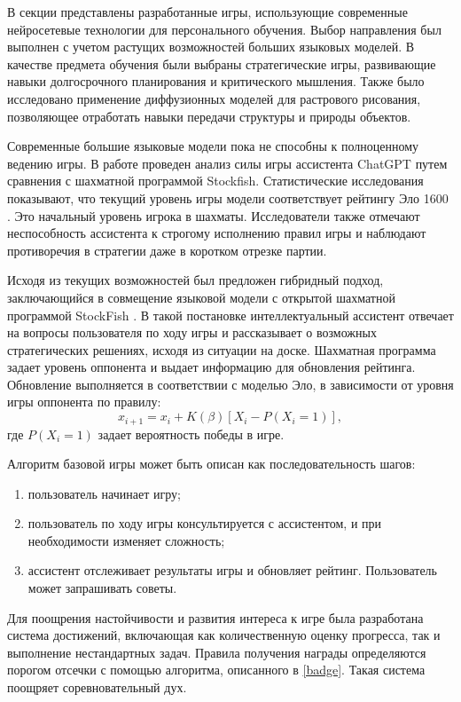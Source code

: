 В секции представлены разработанные игры, использующие современные нейросетевые технологии для 
персонального обучения. Выбор направления был выполнен с учетом растущих возможностей больших языковых моделей. 
В качестве предмета обучения были выбраны стратегические игры, развивающие навыки долгосрочного планирования и критического мышления. 
Также  было исследовано применение диффузионных моделей для растрового рисования, позволяющее отработать навыки передачи
структуры и природы объектов.

Современные большие языковые модели пока не способны к полноценному ведению игры. В работе \cite{Adam2024} проведен анализ силы игры ассистента ChatGPT 
путем сравнения с шахматной программой Stockfish. Статистические исследования показывают, что текущий уровень игры модели соответствует рейтингу Эло 1600
\cite{elo1967proposed}. Это начальный уровень игрока в шахматы. Исследователи также отмечают неспособность ассистента к строгому исполнению правил игры
и наблюдают противоречия в стратегии даже в коротком отрезке партии.

Исходя из текущих возможностей был предложен гибридный подход, заключающийся в совмещение языковой модели с 
открытой шахматной программой StockFish \cite{acher2016large}. В такой постановке интеллектуальный ассистент отвечает на вопросы 
пользователя по ходу игры и рассказывает о возможных стратегических решениях, исходя из ситуации на доске. 
Шахматная программа задает уровень оппонента и выдает информацию для обновления рейтинга. Обновление выполняется в соответствии с моделью Эло, 
в зависимости от уровня игры оппонента по правилу:
\begin{equation}
    x_{i+1}=x_i + K(\beta) \left[X_i-P(X_i=1)\right],
\end{equation}
где $P(X_i=1)$ задает вероятность победы в игре.

Алгоритм базовой игры может быть описан как последовательность шагов:
\begin{enumerate}
    \item пользователь начинает игру;
    \item пользователь по ходу игры консультируется с ассистентом, и при необходимости изменяет сложность;
    \item ассистент отслеживает результаты игры и обновляет рейтинг. Пользователь может запрашивать советы.
\end{enumerate}

Для поощрения настойчивости и развития интереса к игре была разработана система достижений, включающая как количественную оценку прогресса, 
так и выполнение нестандартных задач. Правила получения награды определяются порогом отсечки с помощью алгоритма, описанного в \ref{badge}.
Такая система поощряет соревновательный дух.

